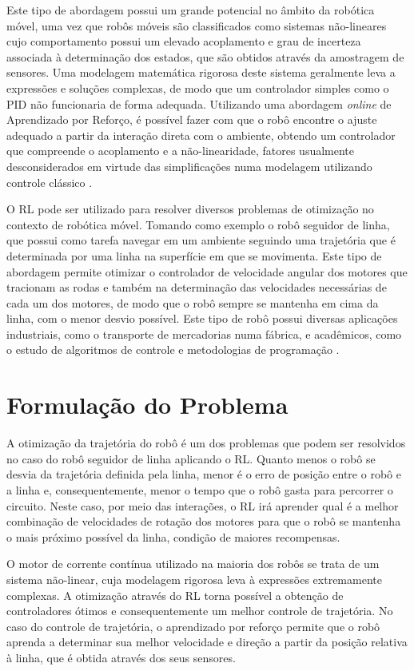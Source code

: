 \documentclass[a4paper]{ifacconf}
\begin{document}
Este tipo de abordagem possui um grande potencial no âmbito da robótica móvel, uma vez que robôs móveis são classificados como sistemas não-lineares cujo comportamento possui um elevado acoplamento e grau de incerteza associada à determinação dos estados, que são obtidos através da amostragem de sensores. Uma modelagem matemática rigorosa deste sistema geralmente leva a expressões e soluções complexas, de modo que um controlador simples como o PID não funcionaria de forma adequada. Utilizando uma abordagem \textit{online} de Aprendizado por Reforço, é possível fazer com que o robô encontre o ajuste adequado a partir da interação direta com o ambiente, obtendo um controlador que compreende o acoplamento e a não-linearidade, fatores usualmente desconsiderados em virtude das simplificações numa modelagem utilizando controle clássico \cite{ql_pid_robotics}.

O RL pode ser utilizado para resolver diversos problemas de otimização no contexto de robótica móvel. Tomando como exemplo o robô seguidor de linha, que possui como tarefa navegar em um ambiente seguindo uma trajetória que é determinada por uma linha na superfície em que se movimenta. Este tipo de abordagem permite otimizar o controlador de velocidade angular dos motores que tracionam as rodas e também na determinação das velocidades necessárias de cada um dos motores, de modo que o robô sempre se mantenha em cima da linha, com o menor desvio possível. Este tipo de robô possui diversas aplicações industriais, como o transporte de mercadorias numa fábrica, e acadêmicos, como o estudo de algoritmos de controle e metodologias de programação \cite{path_plan_pid,lf_line_sens_pos}.


\section{Formulação do Problema}

A otimização da trajetória do robô é um dos problemas que podem ser resolvidos no caso do robô seguidor de linha aplicando o RL. Quanto menos o robô se desvia da trajetória definida pela linha, menor é o erro de posição entre o robô e a linha e, consequentemente, menor o tempo que o robô gasta para percorrer o circuito. Neste caso, por meio das interações, o RL irá aprender qual é a melhor combinação de velocidades de rotação dos motores para que o robô se mantenha o mais próximo possível da linha, condição de maiores recompensas.

O motor de corrente contínua utilizado na maioria dos robôs se trata de um sistema não-linear, cuja modelagem rigorosa leva à expressões extremamente complexas. A otimização através do RL torna possível a obtenção de controladores ótimos e consequentemente um melhor controle de trajetória. No caso do controle de trajetória, o aprendizado por reforço permite que o robô aprenda a determinar sua melhor velocidade e direção a partir da posição relativa à linha, que é obtida através dos seus sensores.
\end{document}
